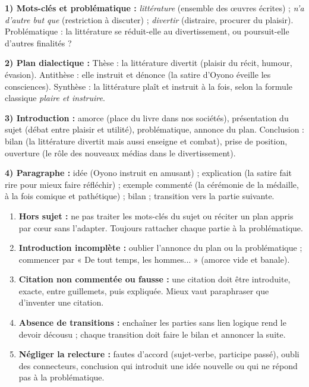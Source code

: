 \documentclass[11pt]{article}
\begin{document}
\begin{corrige}
\textbf{1) Mots-clés et problématique :} \emph{littérature} (ensemble des œuvres écrites) ; \emph{n'a d'autre but que} (restriction à discuter) ; \emph{divertir} (distraire, procurer du plaisir). Problématique : la littérature se réduit-elle au divertissement, ou poursuit-elle d'autres finalités ?
\par \textbf{2) Plan dialectique :} Thèse : la littérature divertit (plaisir du récit, humour, évasion). Antithèse : elle instruit et dénonce (la satire d'Oyono éveille les consciences). Synthèse : la littérature plaît et instruit à la fois, selon la formule classique \emph{plaire et instruire}.
\par \textbf{3) Introduction :} amorce (place du livre dans nos sociétés), présentation du sujet (débat entre plaisir et utilité), problématique, annonce du plan. Conclusion : bilan (la littérature divertit mais aussi enseigne et combat), prise de position, ouverture (le rôle des nouveaux médias dans le divertissement).
\par \textbf{4) Paragraphe :} idée (Oyono instruit en amusant) ; explication (la satire fait rire pour mieux faire réfléchir) ; exemple commenté (la cérémonie de la médaille, à la fois comique et pathétique) ; bilan ; transition vers la partie suivante.
\end{corrige}

\begin{attention}
\begin{enumerate}
\item \textbf{Hors sujet :} ne pas traiter les mots-clés du sujet ou réciter un plan appris par cœur sans l'adapter. Toujours rattacher chaque partie à la problématique.
\item \textbf{Introduction incomplète :} oublier l'annonce du plan ou la problématique ; commencer par « De tout temps, les hommes... » (amorce vide et banale).
\item \textbf{Citation non commentée ou fausse :} une citation doit être introduite, exacte, entre guillemets, puis expliquée. Mieux vaut paraphraser que d'inventer une citation.
\item \textbf{Absence de transitions :} enchaîner les parties sans lien logique rend le devoir décousu ; chaque transition doit faire le bilan et annoncer la suite.
\item \textbf{Négliger la relecture :} fautes d'accord (sujet-verbe, participe passé), oubli des connecteurs, conclusion qui introduit une idée nouvelle ou qui ne répond pas à la problématique.
\end{enumerate}
\end{attention}
\end{document}
